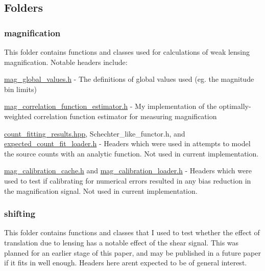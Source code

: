 \subsection*{Folders}

\subsubsection*{magnification}

This folder contains functions and classes used for calculations of weak lensing magnification. Notable headers include\+:


\begin{DoxyItemize}
\item \hyperlink{mag__global__values_8h}{mag\+\_\+global\+\_\+values.\+h} -\/ The definitions of global values used (eg. the magnitude bin limits)
\item \hyperlink{mag__correlation__function__estimator_8h}{mag\+\_\+correlation\+\_\+function\+\_\+estimator.\+h} -\/ My implementation of the optimally-\/weighted correlation function estimator for measuring magnification
\item \hyperlink{count__fitting__results_8hpp}{count\+\_\+fitting\+\_\+results.\+hpp}, Schechter\+\_\+like\+\_\+functor.\+h, and \hyperlink{expected__count__fit__loader_8h}{expected\+\_\+count\+\_\+fit\+\_\+loader.\+h} -\/ Headers which were used in attempts to model the source counts with an analytic function. Not used in current implementation.
\item \hyperlink{mag__calibration__cache_8h}{mag\+\_\+calibration\+\_\+cache.\+h} and \hyperlink{mag__calibration__loader_8h}{mag\+\_\+calibration\+\_\+loader.\+h} -\/ Headers which were used to test if calibrating for numerical errors resulted in any bias reduction in the magnification signal. Not used in current implementation.
\end{DoxyItemize}

\subsubsection*{shifting}

This folder contains functions and classes that I used to test whether the effect of translation due to lensing has a notable effect of the shear signal. This was planned for an earlier stage of this paper, and may be published in a future paper if it fits in well enough. Headers here aren\textquotesingle{}t expected to be of general interest. 